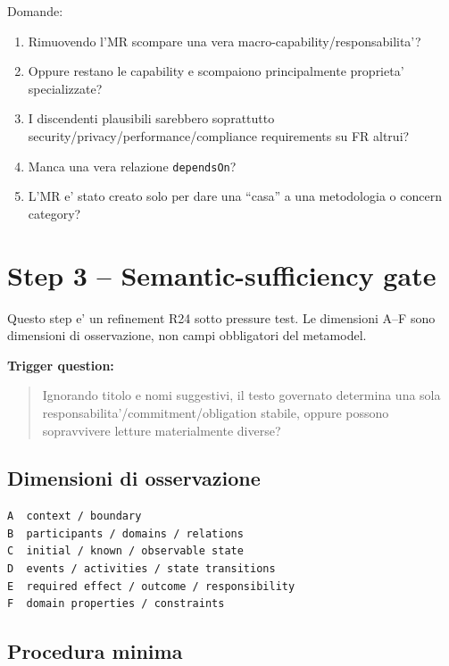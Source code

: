 \documentclass[11pt,a4paper]{article}
\newcommand{\code}[1]{\texttt{#1}}
\begin{document}
Domande:

\begin{enumerate}
\item Rimuovendo l'MR scompare una vera macro-capability/responsabilita'?
\item Oppure restano le capability e scompaiono principalmente proprieta' specializzate?
\item I discendenti plausibili sarebbero soprattutto security/privacy/performance/compliance requirements su FR altrui?
\item Manca una vera relazione \code{dependsOn}?
\item L'MR e' stato creato solo per dare una ``casa'' a una metodologia o concern category?
\end{enumerate}

\section{Step 3 -- Semantic-sufficiency gate}

\begin{statusworking}
Questo step e' un refinement R24 sotto pressure test. Le dimensioni A--F sono dimensioni di osservazione, non campi obbligatori del metamodel.
\end{statusworking}

\textbf{Trigger question:}

\begin{quote}
Ignorando titolo e nomi suggestivi, il testo governato determina una sola responsabilita'/commitment/obligation stabile, oppure possono sopravvivere letture materialmente diverse?
\end{quote}

\subsection{Dimensioni di osservazione}

\begin{lstlisting}
A  context / boundary
B  participants / domains / relations
C  initial / known / observable state
D  events / activities / state transitions
E  required effect / outcome / responsibility
F  domain properties / constraints
\end{lstlisting}

\subsection{Procedura minima}
\end{document}
